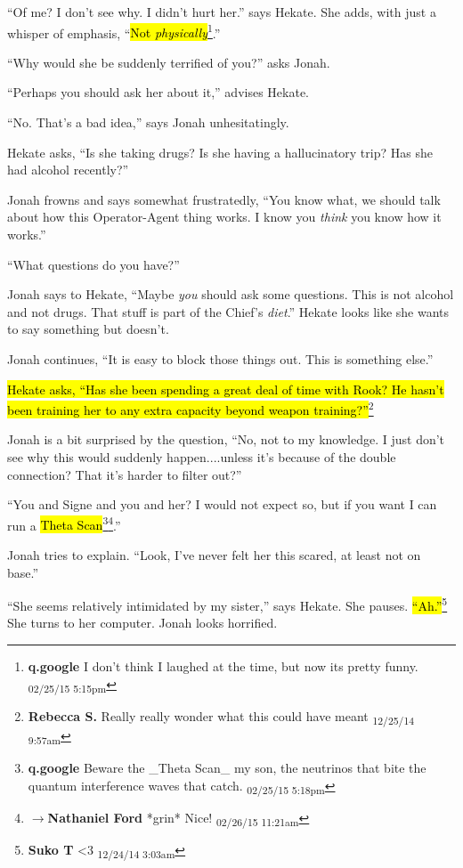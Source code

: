 ``Of me?  I don't see why.  I didn't hurt her.'' says Hekate.  She adds, with just a whisper of emphasis, ``\hl{Not \textit{physically}}\footnote{\textbf{q.google }I don't think I laughed at the time, but now its pretty funny. \textsubscript{02/25/15 5:15pm}}.''

``Why would she be suddenly terrified of you?'' asks Jonah.

``Perhaps you should ask her about it,'' advises Hekate.

``No.  That's a bad idea,'' says Jonah unhesitatingly.

Hekate asks, ``Is she taking drugs?  Is she having a hallucinatory trip?  Has she had alcohol recently?''



Jonah frowns and says somewhat frustratedly, ``You know what, we should talk about how this Operator-Agent thing works.  I know you \textit{think} you know how it works.''

``What questions do you have?''

Jonah says to Hekate, ``Maybe \textit{you }should ask some questions.  This is not alcohol and not drugs. That stuff is part of the Chief's \textit{diet}.'' Hekate looks like she wants to say something but doesn't.

Jonah continues, ``It is easy to block those things out.  This is something else.'' 

\hl{Hekate asks, ``Has she been spending a great deal of time with Rook?  He hasn't been training her to any extra capacity beyond weapon training?''}\footnote{\textbf{Rebecca S. }Really really wonder what this could have meant \textsubscript{12/25/14 9:57am}}

Jonah is a bit surprised by the question, ``No, not to my knowledge.   I just don't see why this would suddenly happen....unless it's because of the double connection?  That it's harder to filter out?''

``You and Signe and you and her?  I would not expect so, but if you want I can run a \hl{Theta Scan}\footnote{\textbf{q.google }Beware the \_Theta Scan\_ my son, the neutrinos that bite the quantum interference waves that catch. \textsubscript{02/25/15 5:18pm}}\footnote{$\rightarrow$\textbf{Nathaniel Ford }*grin* Nice! \textsubscript{02/26/15 11:21am}}.''

Jonah tries to explain. ``Look, I've never felt her this scared, at least not on base.''

``She seems relatively intimidated by my sister,'' says Hekate.  She pauses.  \hl{``Ah.''}\footnote{\textbf{Suko T }\textless 3 \textsubscript{12/24/14 3:03am}}  She turns to her computer.  Jonah looks horrified.

